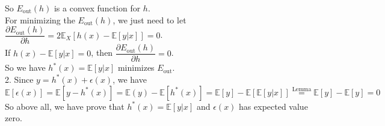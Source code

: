 So $E_{\text{out}}(h)$ is a convex function for $h$.\\
For minimizing the $E_{\text{out}}(h)$, we just need to let $\dfrac{\partial E_{\text{out}}(h)}{\partial h}=2 \mathbb{E}_X\left[h(x)-\mathbb{E}\left[y|x\right]\right]=0$.\\
If $h(x)-\mathbb{E}\left[y|x\right]=0$, then $\dfrac{\partial E_{\text{out}}(h)}{\partial h}=0$.\\
So we have $h^*(x)=\mathbb{E}[y|x]$ minimizes $E_{\text{out}}$.\\ 

2. Since $y=h^*(x)+\epsilon(x)$, we have
$$\mathbb{E}[\epsilon(x)]=\mathbb{E}[y-h^*(x)]=\mathbb{E}(y)-\mathbb{E}[h^*(x)]=\mathbb{E}[y]-\mathbb{E}\left[\mathbb{E}[y|x]\right]\stackrel{\text{Lemma}}{=}\mathbb{E}[y]-\mathbb{E}[y]=0$$
So above all, we have prove that $h^*(x)=\mathbb{E}[y|x]$ and $\epsilon(x)$ has expected value zero.\\
\newpage